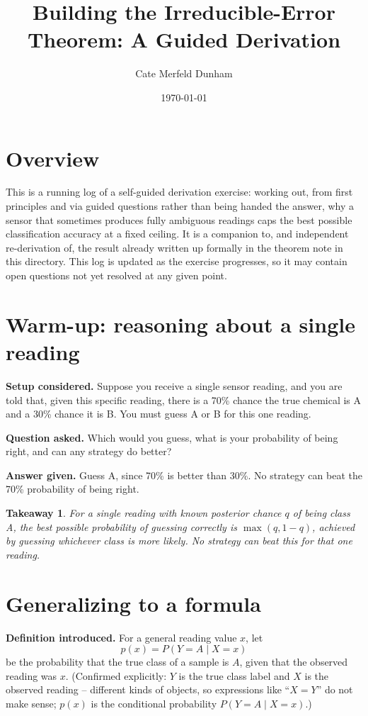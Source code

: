 \documentclass[11pt]{article}
\title{Building the Irreducible-Error Theorem: A Guided Derivation}
\author{Cate Merfeld Dunham}
\date{\today}
\newtheorem*{takeaway}{Takeaway}
\begin{document}
\maketitle

\section*{Overview}

This is a running log of a self-guided derivation exercise: working out, from
first principles and via guided questions rather than being handed the
answer, why a sensor that sometimes produces fully ambiguous readings caps
the best possible classification accuracy at a fixed ceiling. It is a
companion to, and independent re-derivation of, the result already written
up formally in the theorem note in this directory. This log is updated as
the exercise progresses, so it may contain open questions not yet resolved
at any given point.

\section{Warm-up: reasoning about a single reading}

\textbf{Setup considered.} Suppose you receive a single sensor reading, and
you are told that, given this specific reading, there is a 70\% chance the
true chemical is A and a 30\% chance it is B. You must guess A or B for this
one reading.

\textbf{Question asked.} Which would you guess, what is your probability of
being right, and can any strategy do better?

\textbf{Answer given.} Guess A, since 70\% is better than 30\%. No strategy
can beat the 70\% probability of being right.

\begin{takeaway}
For a single reading with known posterior chance $q$ of being class A, the
best possible probability of guessing correctly is $\max(q, 1-q)$, achieved
by guessing whichever class is more likely. No strategy can beat this for
that one reading.
\end{takeaway}

\section{Generalizing to a formula}

\textbf{Definition introduced.} For a general reading value $x$, let
\[
  p(x) = P(Y = A \mid X = x)
\]
be the probability that the true class of a sample is $A$, given that the
observed reading was $x$. (Confirmed explicitly: $Y$ is the true class label
and $X$ is the observed reading -- different kinds of objects, so
expressions like ``$X=Y$'' do not make sense; $p(x)$ is the conditional
probability $P(Y=A\mid X=x)$.)
\end{document}
